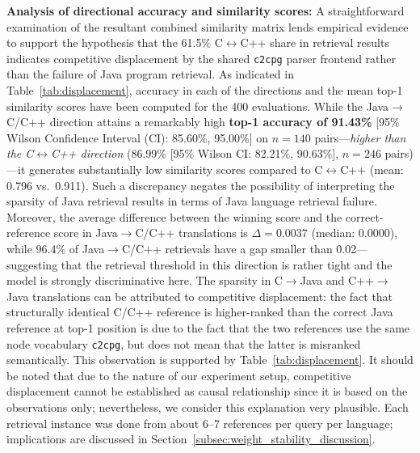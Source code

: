 \textbf{Analysis of directional accuracy and similarity scores:} A straightforward examination of the resultant combined similarity matrix lends empirical evidence to support the hypothesis that the 61.5\% C$\leftrightarrow$C++ share in retrieval results indicates competitive displacement by the shared \texttt{c2cpg} parser frontend rather than the failure of Java program retrieval. As indicated in Table~\ref{tab:displacement}, accuracy in each of the directions and the mean top-1 similarity scores have been computed for the 400 evaluations. While the Java$\rightarrow$C/C++ direction attains a remarkably high \textbf{top-1 accuracy of 91.43\%} [95\% Wilson Confidence Interval (CI): 85.60\%, 95.00\%] on $n=140$ pairs---\textit{higher than the C$\leftrightarrow$C++ direction} (86.99\% [95\% Wilson CI: 82.21\%, 90.63\%], $n=246$ pairs)---it generates substantially low similarity scores compared to C$\leftrightarrow$C++ (mean: 0.796 vs.\ 0.911). Such a discrepancy negates the possibility of interpreting the sparsity of Java retrieval results in terms of Java language retrieval failure. Moreover, the average difference between the winning score and the correct-reference score in Java$\rightarrow$C/C++ translations is $\Delta=0.0037$ (median: 0.0000), while 96.4\% of Java$\rightarrow$C/C++ retrievals have a gap smaller than 0.02---suggesting that the retrieval threshold in this direction is rather tight and the model is strongly discriminative here. The sparsity in C$\rightarrow$Java and C++$\rightarrow$Java translations can be attributed to competitive displacement: the fact that structurally identical C/C++ reference is higher-ranked than the correct Java reference at top-1 position is due to the fact that the two references use the same node vocabulary \texttt{c2cpg}, but does not mean that the latter is misranked semantically. This observation is supported by Table~\ref{tab:displacement}. It should be noted that due to the nature of our experiment setup, competitive displacement cannot be established as causal relationship since it is based on the observations only; nevertheless, we consider this explanation very plausible. Each retrieval instance was done from about 6--7 references per query per language; implications are discussed in Section~\ref{subsec:weight_stability_discussion}.
